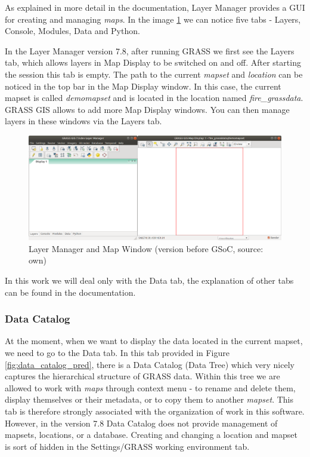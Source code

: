 \documentclass[a4paper,10pt,twoside]{article}
\begin{document}
As explained in more detail in the documentation, Layer Manager provides a GUI for creating and managing \textit{maps}. In the image \ref{fig:empty_layers1} we can notice five tabs - Layers, Console, Modules, Data and Python.

In the Layer Manager version 7.8, after running GRASS we first see the Layers tab, which allows layers in Map Display to be switched on and off. After starting the session this tab is empty. The path to the current \textit{mapset} and \textit{location} can be noticed in the top bar in the Map Display window. In this case, the current mapset is called \textit{demomapset} and is located in the location named \textit{fire\_grassdata}. GRASS GIS allows to add more Map Display windows. You can then manage layers in these windows via the Layers tab.
\vspace{0.3cm}
\begin{figure}[hbt!] 
\begin{center}
\includegraphics[width=15cm]{../pictures/empty_layers1.png} 
\caption[Layer Manager and Map Window (version before GSoC)]{Layer Manager and Map Window  (version before GSoC, source: own)}
\label{fig:empty_layers1}
\end{center}
\end{figure}

\noindent In this work we will deal only with the Data tab, the explanation of other tabs can be found in the documentation.
 
\newpage
\vspace*{-1cm}
\subsubsection{Data Catalog}

At the moment, when we want to display the data located in the current mapset, we need to go to the Data tab. In this tab provided in Figure \ref{fig:data_catalog_pred}, there is a Data Catalog (Data Tree) which very nicely captures the hierarchical structure of GRASS data. Within this tree we are allowed to work with \textit{maps} through context menu - to rename and delete them, display themselves or their metadata, or to copy them to another \textit{mapset}. This tab is therefore strongly associated with the organization of work in this software. However, in the version 7.8 Data Catalog does not provide management of mapsets, locations, or a database. Creating and changing a location and mapset is sort of hidden in the Settings/GRASS working environment tab.
\end{document}

